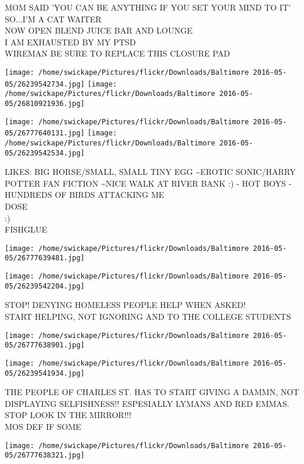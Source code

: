 \documentclass[10pt,letterpaper]{article}
\begin{document}
MOM SAID 'YOU CAN BE ANYTHING IF YOU SET YOUR MIND TO IT' SO...I'M A CAT WAITER\\
NOW OPEN BLEND JUICE BAR AND LOUNGE\\
I AM EXHAUSTED BY MY PTSD\\
WIREMAN BE SURE TO REPLACE THIS CLOSURE PAD
\pagebreak

\texttt{[image: /home/swickape/Pictures/flickr/Downloads/Baltimore 2016-05-05/26239542734.jpg]}
\texttt{[image: /home/swickape/Pictures/flickr/Downloads/Baltimore 2016-05-05/26810921936.jpg]}

\texttt{[image: /home/swickape/Pictures/flickr/Downloads/Baltimore 2016-05-05/26777640131.jpg]}
\texttt{[image: /home/swickape/Pictures/flickr/Downloads/Baltimore 2016-05-05/26239542534.jpg]}

LIKES: BIG HORSE/SMALL, SMALL TINY EGG \textasciitilde{}EROTIC SONIC/HARRY POTTER FAN FICTION \textasciitilde{}NICE WALK AT RIVER BANK :) {-} HOT BOYS {-} HUNDREDS OF BIRDS ATTACKING ME\\
DOSE\\
:)\\
FISHGLUE
\pagebreak

\texttt{[image: /home/swickape/Pictures/flickr/Downloads/Baltimore 2016-05-05/26777639481.jpg]}

\vspace{0.25in}
\texttt{[image: /home/swickape/Pictures/flickr/Downloads/Baltimore 2016-05-05/26239542204.jpg]}

STOP! DENYING HOMELESS PEOPLE HELP WHEN ASKED!\\
START HELPING, NOT IGNORING  AND TO THE COLLEGE STUDENTS
\pagebreak

\texttt{[image: /home/swickape/Pictures/flickr/Downloads/Baltimore 2016-05-05/26777638901.jpg]}

\vspace{0.25in}
\texttt{[image: /home/swickape/Pictures/flickr/Downloads/Baltimore 2016-05-05/26239541934.jpg]}

THE PEOPLE OF CHARLES ST. HAS TO START GIVING A DAMMN, NOT DISPLAYING SELFISHNESS!! ESPESIALLY LYMANS AND RED EMMAS.  STOP LOOK IN THE MIRROR!!!\\
MOS DEF IF SOME
\pagebreak

\texttt{[image: /home/swickape/Pictures/flickr/Downloads/Baltimore 2016-05-05/26777638321.jpg]}
\end{document}
